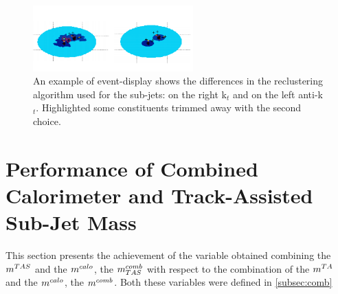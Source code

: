 \begin{figure}[!ht]
  \centering
      \includegraphics[width=0.55\textwidth]{jet_part/mtas/evtdspl.png}
  \caption[Different reclustering in event display]{An example of event-display shows the differences in the reclustering algorithm used for the sub-jets: on the right  k$_t$ and on the left anti-k$_t$. Highlighted some constituents trimmed away with the second choice.}
  \label{fig:evtdspl}
\end{figure}



   

   

   
\clearpage
\section{Performance of Combined Calorimeter and Track-Assisted Sub-Jet Mass}
This section presents the achievement of the variable obtained combining the $m^{TAS}$ and the $m^{calo}$, the $m^{comb}_{TAS}$ with respect to the combination of the $m^{TA}$ and the $m^{calo}$, the $m^{comb}$. Both these variables were defined in \ref{subsec:comb}

